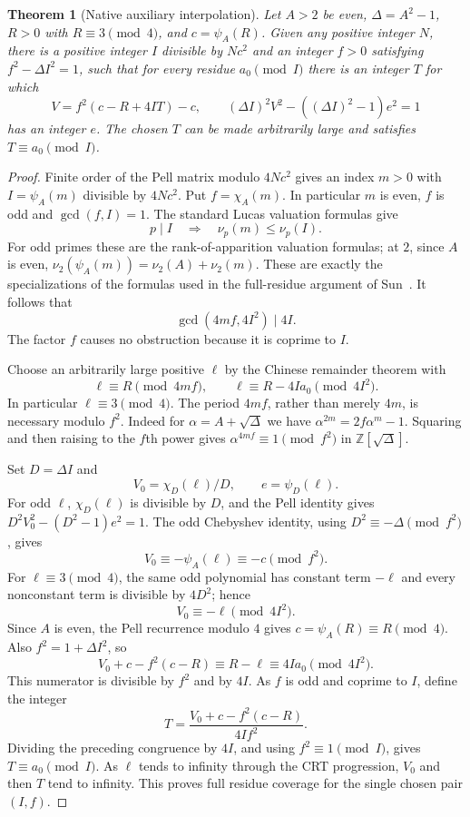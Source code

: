 \documentclass[11pt,a4paper]{article}
\newtheorem{theorem}{Theorem}[section]
\theoremstyle{definition}\newtheorem{definition}[theorem]{Definition}
\theoremstyle{remark}\newtheorem{remark}[theorem]{Remark}
\newcommand{\Z}{\mathbb Z}\newcommand{\Q}{\mathbb Q}\newcommand{\N}{\mathbb N}\newcommand{\R}{\mathbb R}
\numberwithin{equation}{section}
\begin{document}
\begin{theorem}[Native auxiliary interpolation]\label{thm:interpolation}
Let $A>2$ be even, $\Delta=A^2-1$, $R>0$ with $R\equiv3\pmod4$,
and $c=\psi_A(R)$. Given any positive integer $N$, there is a positive
integer $I$ divisible by $Nc^2$ and an integer $f>0$ satisfying
$f^2-\Delta I^2=1$, such that for every residue $a_0\pmod I$ there
is an integer $T$ for which
\[
 V=f^2(c-R+4IT)-c,\qquad
 (\Delta I)^2V^2-((\Delta I)^2-1)e^2=1
\]
has an integer $e$. The chosen $T$ can be made arbitrarily large and
satisfies $T\equiv a_0\pmod I$.
\end{theorem}
\begin{proof}
Finite order of the Pell matrix modulo $4Nc^2$ gives an index $m>0$
with $I=\psi_A(m)$ divisible by $4Nc^2$. Put $f=\chi_A(m)$.
In particular $m$ is even, $f$ is odd and $\gcd(f,I)=1$.
The standard Lucas valuation formulas give
\begin{equation}
 p\mid I\quad\Longrightarrow\quad\nu_p(m)\le\nu_p(I).
 \label{eq:valuation}
\end{equation}
For odd primes these are the rank-of-apparition valuation formulas;
at $2$, since $A$ is even,
$\nu_2(\psi_A(m))=\nu_2(A)+\nu_2(m)$. These are exactly the
specializations of the formulas used in the full-residue argument of
Sun~\cite{sun2026,sanna}. It follows that
\[
 \gcd(4mf,4I^2)\mid4I.
\]
The factor $f$ causes no obstruction because it is coprime to $I$.

Choose an arbitrarily large positive $\ell$ by the Chinese remainder
theorem with
\begin{equation}
 \ell\equiv R\pmod{4mf},\qquad
 \ell\equiv R-4Ia_0\pmod{4I^2}.
 \label{eq:ellcrt}
\end{equation}
In particular $\ell\equiv3\pmod4$. The period $4mf$, rather than
merely $4m$, is necessary modulo $f^2$. Indeed for
$\alpha=A+\sqrt\Delta$ we have
$\alpha^{2m}=2f\alpha^m-1$. Squaring and then raising to the
$f$th power gives $\alpha^{4mf}\equiv1\pmod{f^2}$ in
$\Z[\sqrt\Delta]$.

Set $D=\Delta I$ and
\[
 V_0=\chi_D(\ell)/D,\qquad e=\psi_D(\ell).
\]
For odd $\ell$, $\chi_D(\ell)$ is divisible by $D$, and the Pell
identity gives $D^2V_0^2-(D^2-1)e^2=1$.
The odd Chebyshev identity, using $D^2\equiv-\Delta\pmod{f^2}$,
gives
\[
 V_0\equiv-\psi_A(\ell)\equiv-c\pmod{f^2}.
\]
For $\ell\equiv3\pmod4$, the same odd polynomial has constant
term $-\ell$ and every nonconstant term is divisible by $4D^2$;
hence
\[
 V_0\equiv-\ell\pmod{4I^2}.
\]
Since $A$ is even, the Pell recurrence modulo $4$ gives
$c=\psi_A(R)\equiv R\pmod4$. Also
$f^2=1+\Delta I^2$, so
\[
 V_0+c-f^2(c-R)\equiv R-\ell\equiv4Ia_0\pmod{4I^2}.
\]
This numerator is divisible by $f^2$ and by $4I$. As $f$ is odd
and coprime to $I$, define the integer
\[
 T=\frac{V_0+c-f^2(c-R)}{4If^2}.
\]
Dividing the preceding congruence by $4I$, and using
$f^2\equiv1\pmod I$, gives $T\equiv a_0\pmod I$.
As $\ell$ tends to infinity through the CRT progression, $V_0$ and
then $T$ tend to infinity. This proves full residue coverage for the
single chosen pair $(I,f)$.
\end{proof}
\end{document}
